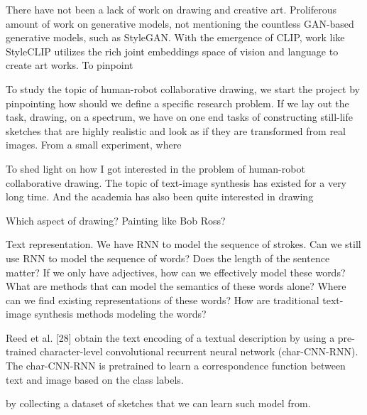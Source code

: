 There have not been a lack of work on drawing and creative art. Proliferous amount of work on generative models, not mentioning the countless GAN-based generative models, such as StyleGAN. With the emergence of CLIP, work like StyleCLIP utilizes the rich joint embeddings space of vision and language to create art works. To pinpoint 

To study the topic of human-robot collaborative drawing, we start the project by pinpointing how should we define a specific research problem. If we lay out the task, drawing, on a spectrum, we have on one end tasks of constructing still-life sketches that are highly realistic and look as if they are transformed from real images. From a small experiment, where  



To shed light on how I got interested in the problem of human-robot collaborative drawing. The topic of text-image synthesis has existed for a very long time. And the academia has also been quite interested in drawing 

Which aspect of drawing? Painting like Bob Ross? 

Text representation. 
We have RNN to model the sequence of strokes. Can we still use RNN to model the sequence of words? Does the length of the sentence matter? If we only have adjectives, how can we effectively model these words? What are methods that can model the semantics of these words alone? Where can we find existing representations of these words? How are traditional text-image synthesis methods modeling the words? 

Reed et al. [28] obtain the text encoding of a textual description by using a pre-trained character-level convolutional recurrent neural network (char-CNN-RNN). The char-CNN-RNN is pretrained to learn a correspondence function between text and image based on the class labels. 


by collecting a dataset of sketches that we can learn such model from. 




